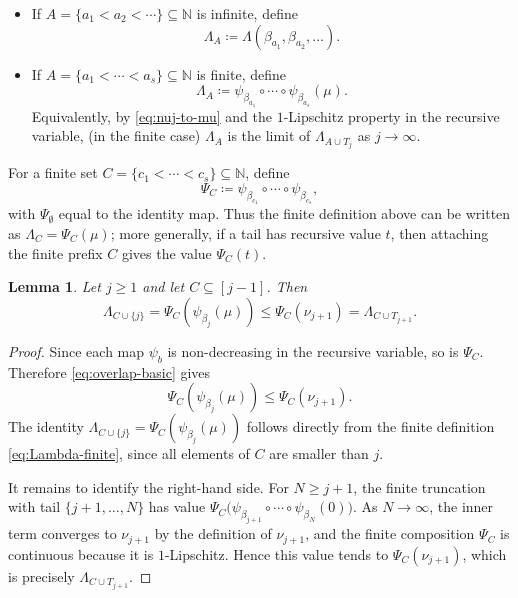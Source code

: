 \documentclass[10pt]{article}
\numberwithin{equation}{section}
\newtheorem{lemma}[theorem]{Lemma}
\newcommand{\N}{\mathbb{N}}
\begin{document}
\begin{itemize}
\item If $A=\{a_1<a_2<\cdots\}\subseteq\N$ is infinite, define
\[
        \Lambda_A\coloneqq \Lambda(\beta_{a_1},\beta_{a_2},\ldots).
\]

\item If $A=\{a_1<\cdots<a_s\}\subseteq\N$ is finite, define
\begin{equation}
        \Lambda_A\coloneqq \psi_{\beta_{a_1}}\circ\cdots\circ\psi_{\beta_{a_s}}(\mu).
        \label{eq:Lambda-finite}
\end{equation}
Equivalently, by \eqref{eq:nuj-to-mu} and the $1$-Lipschitz property in the recursive variable, (in the finite case) $\Lambda_A$ is the limit of $\Lambda_{A\cup T_j}$ as $j\to\infty$.
\end{itemize}

For a finite set $C=\{c_1<\cdots<c_s\}\subseteq\N$, define
\[
        \Psi_C\coloneqq \psi_{\beta_{c_1}}\circ\cdots\circ\psi_{\beta_{c_s}},
\]
with $\Psi_\emptyset$ equal to the identity map.
Thus the finite definition above can be written as $\Lambda_C=\Psi_C(\mu)$; more generally, if a tail has recursive value $t$, then attaching the finite prefix $C$ gives the value $\Psi_C(t)$.

\begin{lemma}\label{lem:overlap-property}
Let $j\ge 1$ and let $C\subseteq [j-1]$. Then
\begin{equation}
        \Lambda_{C\cup\{j\}} =\Psi_C(\psi_{\beta_j}(\mu)) \le \Psi_C(\nu_{j+1}) =\Lambda_{C\cup T_{j+1}}.
        \label{eq:overlap-property}
\end{equation}
\end{lemma}

\begin{proof}
Since each map $\psi_b$ is non-decreasing in the recursive variable, so is $\Psi_C$. Therefore \eqref{eq:overlap-basic} gives
\[
        \Psi_C(\psi_{\beta_j}(\mu))\le \Psi_C(\nu_{j+1}).
\]
The identity $\Lambda_{C\cup\{j\}}=\Psi_C(\psi_{\beta_j}(\mu))$ follows directly from the finite definition \eqref{eq:Lambda-finite}, since all elements of $C$ are smaller than $j$.

It remains to identify the right-hand side. For $N\ge j+1$, the finite truncation with tail $\{j+1,\ldots,N\}$ has value $\Psi_C\bigl(\psi_{\beta_{j+1}}\circ\cdots\circ\psi_{\beta_N}(0)\bigr)$. 
As $N\to\infty$, the inner term converges to $\nu_{j+1}$ by the definition of $\nu_{j+1}$, and the finite composition $\Psi_C$ is continuous because it is $1$-Lipschitz. Hence this value tends to $\Psi_C(\nu_{j+1})$, which is precisely $\Lambda_{C\cup T_{j+1}}$.
\end{proof}
\end{document}
